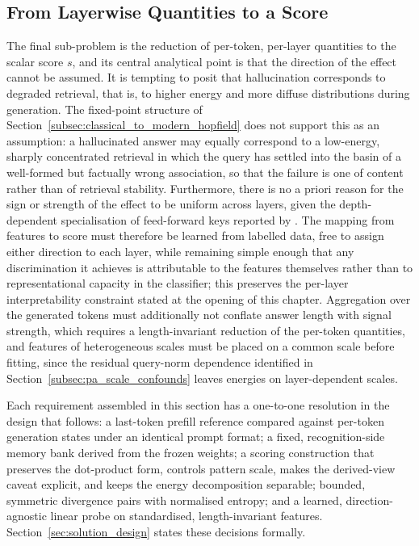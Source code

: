 \subsection{From Layerwise Quantities to a Score}
\label{subsec:pa_aggregation}

The final sub-problem is the reduction of per-token, per-layer quantities to
the scalar score $s$, and its central analytical point is that the direction
of the effect cannot be assumed. It is tempting to posit that hallucination
corresponds to degraded retrieval, that is, to higher energy and more
diffuse distributions during generation. The fixed-point structure of
Section~\ref{subsec:classical_to_modern_hopfield} does not support this as
an assumption: a hallucinated answer may equally correspond to a low-energy,
sharply concentrated retrieval in which the query has settled into the basin
of a well-formed but factually wrong association, so that the failure is one
of content rather than of retrieval stability. Furthermore, there is no a
priori reason for the sign or strength of the effect to be uniform across
layers, given the depth-dependent specialisation of feed-forward keys
reported by \citet{geva2021transformer}. The mapping from features to score
must therefore be learned from labelled data, free to assign either
direction to each layer, while remaining simple enough that any
discrimination it achieves is attributable to the features themselves rather
than to representational capacity in the classifier; this preserves the
per-layer interpretability constraint stated at the opening of this chapter.
Aggregation over the generated tokens must additionally not conflate answer
length with signal strength, which requires a length-invariant reduction of
the per-token quantities, and features of heterogeneous scales must be
placed on a common scale before fitting, since the residual query-norm
dependence identified in Section~\ref{subsec:pa_scale_confounds} leaves
energies on layer-dependent scales.

Each requirement assembled in this section has a one-to-one resolution in
the design that follows: a last-token prefill reference compared against
per-token generation states under an identical prompt format; a fixed,
recognition-side memory bank derived from the frozen weights; a scoring
construction that preserves the dot-product form, controls pattern scale,
makes the derived-view caveat explicit, and keeps the energy decomposition
separable; bounded, symmetric divergence pairs with normalised entropy; and
a learned, direction-agnostic linear probe on standardised, length-invariant
features. Section~\ref{sec:solution_design} states these decisions formally.
